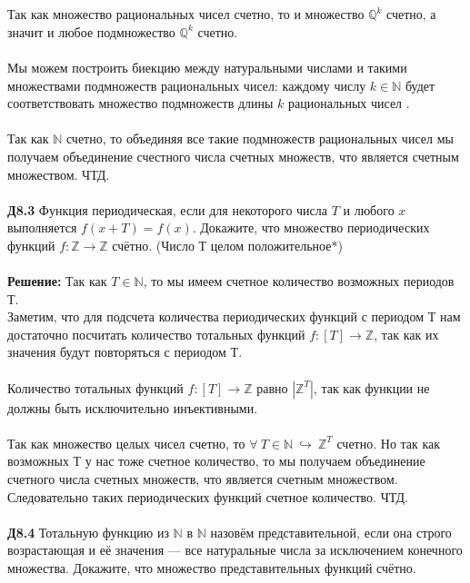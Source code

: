 \documentclass[a4paper, 12pt]{article}
\begin{document}
    \\
    \\ Так как множество рациональных чисел счетно, то и множество $\mathbb{Q}^k$ счетно, а значит и любое подмножество $\mathbb{Q}^k$ счетно.
    \\
    \\ Мы можем построить биекцию между натуральными числами и такими множествами подмножеств рациональных чисел: каждому числу $k \in \mathbb{N}$ будет соответствовать множество подмножеств длины $k$ рациональных чисел .
    \\    
    \\ Так как $\mathbb{N}$ счетно, то объединяя все такие подмножеств рациональных чисел мы получаем объединение счестного числа счетных множеств, что является счетным множеством. ЧТД.
    \\
    \\ \textbf{Д8.3} Функция периодическая, если для некоторого числа $T$ и любого $x$ выполняется $f(x + T) = f(x)$.
    Докажите, что множество периодических функций $f: \mathbb{Z} \to \mathbb{Z}$ счётно. (Число Т целом положительное*)
    \\
    \\ \textbf{Решение: } Так как $T \in \mathbb{N}$, то мы имеем счетное количество возможных периодов Т.
    \\ Заметим, что для подсчета количества периодических функций с периодом Т нам достаточно посчитать количество тотальных функций $f: [T] \to \mathbb{Z}$, так как их значения будут повторяться с периодом Т.
    \\
    \\ Количество тотальных функций $f: [T] \to \mathbb{Z}$ равно $|\mathbb{Z}^T|$, так как функции не должны быть исключительно инъективными.
    \\
    \\ Так как множество целых чисел счетно, то $\forall \ T \in \mathbb{N} \ \hookrightarrow \ \mathbb{Z}^T$ счетно. Но так как возможных Т у нас тоже счетное количество, то мы получаем объединение счетного числа счетных множеств, что является счетным множеством. Следовательно таких периодических функций счетное количество. ЧТД.
    \\
    \\ \textbf{Д8.4} Тотальную функцию из $\mathbb{N}$ в $\mathbb{N}$ назовём представительной, если она строго возрастающая и её
    значения — все натуральные числа за исключением конечного множества. Докажите, что множество
    представительных функций счётно.
    \\
\end{document}
